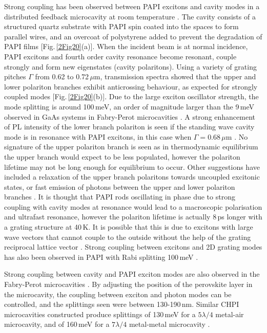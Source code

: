 Strong coupling has been observed between PAPI excitons and cavity modes in a distributed feedback microcavity at room temperature \cite{Fujita1998, Fujita1999, Fujita2000}. The cavity consists of a structured quartz substrate with PAPI spin coated into the spaces to form parallel wires, and an overcoat of polystyrene added to prevent the degradation of PAPI films [Fig.\,\ref{2Fig20}(a)]. When the incident beam is at normal incidence, PAPI excitons and fourth order cavity resonance become resonant, couple strongly and form new eigenstates (cavity polaritons). Using a variety of grating pitches $\Gamma$ from 0.62 to 0.72\,$\mu$m, transmission spectra showed that the upper and lower polariton branches exhibit anticrossing behaviour, as expected for strongly coupled modes [Fig.\,\ref{2Fig20}(b)]. Due to the large exciton oscillator strength, the mode splitting is around 100\,meV, an order of magnitude larger than the 9\,meV observed in GaAs systems in Fabry-Perot microcavities \cite{Fujita1998}. A strong enhancement of PL intensity of the lower branch polariton is seen if the standing wave cavity mode is in resonance with PAPI excitons, in this case when $\Gamma=0.68\,\mu$m \cite{Fujita1999}. No signature of the upper polariton branch is seen as in thermodynamic equilibrium the upper branch would expect to be less populated, however the polariton lifetime may not be long enough for equilibrium to occur. Other suggestions have included a relaxation of the upper branch polaritons towards uncoupled excitonic states, or fast emission of photons between the upper and lower polariton branches \cite{Lanty2008}. It is thought that PAPI rods oscillating in phase due to strong coupling with cavity modes at resonance would lead to a macroscopic polarisation and ultrafast resonance, however the polariton lifetime is actually 8\,ps longer with a grating structure at 40\,K. It is possible that this is due to excitons with large wave vectors that cannot couple to the outside without the help of the grating reciprocal lattice vector \cite{Fujita2000}. Strong coupling between excitons and 2D grating modes has also been observed in PAPI with Rabi splitting 100\,meV \cite{Ishi-Hayase2003}.

Strong coupling between cavity and PAPI exciton modes are also observed in the Fabry-Perot microcavities \cite{Brehier2006, Lanty2008}. By adjusting the position of the perovskite layer in the microcavity, the coupling between exciton and photon modes can be controlled, and the splittings seen were between 130-190\,nm. Similar CHPI microcavities constructed produce splittings of 130\,meV for a $5\lambda/4$ metal-air microcavity, and of 160\,meV for a $7\lambda/4$ metal-metal microcavity \cite{Pradeesh2009b}.

